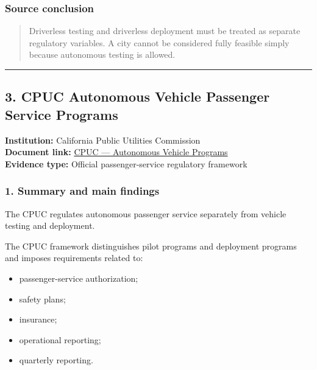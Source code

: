 \documentclass[10pt,a4paper]{article}
\providecommand{\tightlist}{\setlength{\itemsep}{0pt}\setlength{\parskip}{0pt}}
\begin{document}
\hypertarget{source-conclusion-1}{%
\subsubsection{Source conclusion}\label{source-conclusion-1}}

\begin{quote}
Driverless testing and driverless deployment must be treated as separate regulatory variables. A city cannot be considered fully feasible simply because autonomous testing is allowed.
\end{quote}

\begin{center}\rule{0.5\linewidth}{0.5pt}\end{center}

\hypertarget{cpuc-autonomous-vehicle-passenger-service-programs}{%
\subsection{3. CPUC Autonomous Vehicle Passenger Service Programs}\label{cpuc-autonomous-vehicle-passenger-service-programs}}

\textbf{Institution:} California Public Utilities Commission\\
\textbf{Document link:} \href{https://www.cpuc.ca.gov/regulatory-services/licensing/transportation-licensing-and-analysis-branch/autonomous-vehicle-programs}{CPUC --- Autonomous Vehicle Programs}\\
\textbf{Evidence type:} Official passenger-service regulatory framework

\hypertarget{summary-and-main-findings-2}{%
\subsubsection{1. Summary and main findings}\label{summary-and-main-findings-2}}

The CPUC regulates autonomous passenger service separately from vehicle testing and deployment.

The CPUC framework distinguishes pilot programs and deployment programs and imposes requirements related to:

\begin{itemize}
\tightlist
\item
  passenger-service authorization;
\item
  safety plans;
\item
  insurance;
\item
  operational reporting;
\item
  quarterly reporting.
\end{itemize}
\end{document}
